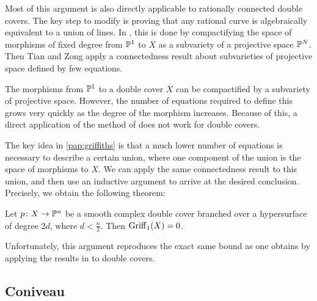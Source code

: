 Most of this argument is also directly applicable to rationally connected double covers. The key step to modify is proving that any rational curve is algebraically equivalent to a union of lines. In \cite{TianZong}, this is done by compactifying the space of morphisms of fixed degree from $\P^1$ to $X$ as a subvariety of a projective space $\P^N$. Then Tian and Zong apply a connectedness result about subvarieties of projective space defined by few equations. %

The morphisms from $\P^1$ to a double cover $X$ can be compactified by a subvariety of projective space. However, the number of equations required to define this grows very quickly as the degree of the morphism increases. Because of this, a direct application of the method of \cite{TianZong} does not work for double covers.

The key idea in \cref{pap:griffiths} is that a much lower number of equations is necessary to describe a certain union, where one component of the union is the space of morphisms to $X$. We can apply the same connectedness result to this union, and then use an inductive argument to arrive at the desired conclusion. Precisely, we obtain the following theorem:
\begin{theorem}
	Let $p \from X \to \P^n$ be a smooth complex double cover branched over a hypersurface of degree $2d$, where $d < \frac{n}{2}$. Then $\Griff_1(X) = 0$.
\end{theorem}
Unfortunately, this argument reproduces the exact same bound as one obtains by applying the results in \cite{MinoccheriPan} to double covers.

\subsection{Coniveau}

